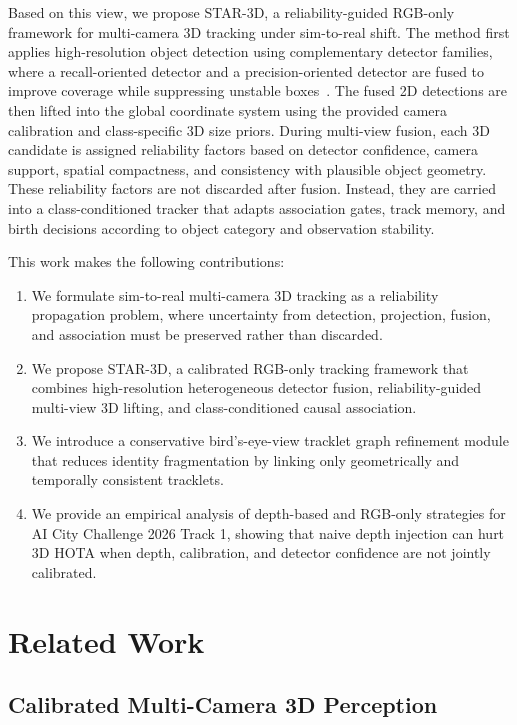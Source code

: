 \documentclass[runningheads]{llncs}
\begin{document}
Based on this view, we propose STAR-3D, a reliability-guided RGB-only framework
for multi-camera 3D tracking under sim-to-real shift. The method first applies
high-resolution object detection using complementary detector families, where a
recall-oriented detector and a precision-oriented detector are fused to improve
coverage while suppressing unstable boxes~\cite{solovyev2021wbf,peng2025dfine}.
The fused 2D detections are then lifted into the global coordinate system using the
provided camera calibration and class-specific 3D size priors. During multi-view
fusion, each 3D candidate is assigned reliability factors based on detector
confidence, camera support, spatial compactness, and consistency with plausible
object geometry. These reliability factors are not discarded after fusion.
Instead, they are carried into a class-conditioned tracker that adapts association
gates, track memory, and birth decisions according to object category and
observation stability.

This work makes the following contributions:
\begin{enumerate}
    \item We formulate sim-to-real multi-camera 3D tracking as a reliability
    propagation problem, where uncertainty from detection, projection, fusion,
    and association must be preserved rather than discarded.
    \item We propose STAR-3D, a calibrated RGB-only tracking framework that
    combines high-resolution heterogeneous detector fusion, reliability-guided
    multi-view 3D lifting, and class-conditioned causal association.
    \item We introduce a conservative bird's-eye-view tracklet graph refinement
    module that reduces identity fragmentation by linking only geometrically and
    temporally consistent tracklets.
    \item We provide an empirical analysis of depth-based and RGB-only strategies
    for AI City Challenge 2026 Track 1, showing that naive depth injection can hurt
    3D HOTA when depth, calibration, and detector confidence are not jointly
    calibrated.
\end{enumerate}

\section{Related Work}
\label{sec:related_work}

\subsection{Calibrated Multi-Camera 3D Perception}
\label{sec:related_multicamera}
\end{document}
